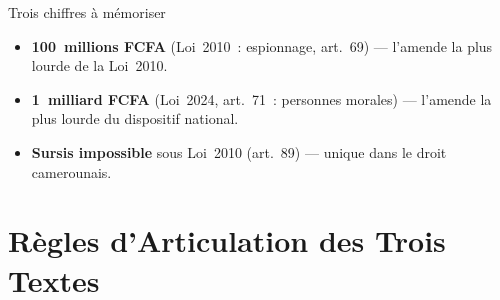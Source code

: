 \begin{boiteRemarque}{Trois chiffres à mémoriser}
\begin{itemize}
    \item \textbf{100~millions FCFA} (Loi~2010~: espionnage, art.~69)
          --- l'amende la plus lourde de la Loi~2010.
    \item \textbf{1~milliard FCFA} (Loi~2024, art.~71~: personnes morales)
          --- l'amende la plus lourde du dispositif national.
    \item \textbf{Sursis impossible} sous Loi~2010 (art.~89) --- unique
          dans le droit camerounais.
\end{itemize}
\end{boiteRemarque}

\section{Règles d'Articulation des Trois Textes}
\label{sec:articulation}

